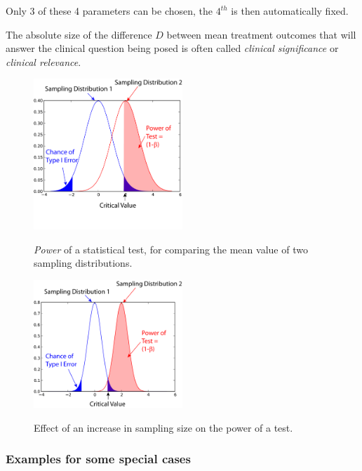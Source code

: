 Only 3 of these 4 parameters can be chosen, the $4^{th}$ is then automatically fixed.

The absolute size of the difference $D$ between mean treatment outcomes that will answer the clinical question being posed is often called \emph{clinical significance} or \emph{clinical relevance}.

\begin{figure}[!ht]
  \centering
  \includegraphics[width=0.5\textwidth]{../Images/power1.png}\\
  \caption{\emph{Power} of a statistical test, for comparing the mean value of two sampling distributions.}\label{fig:power1}
\end{figure}

\begin{figure}[!ht]
  \centering
  \includegraphics[width=0.5\textwidth]{../Images/power2.png}\\
  \caption{Effect of an increase in sampling size on the power of a test.}\label{fig:power2}
\end{figure}

\subsubsection{Examples for some special cases}

